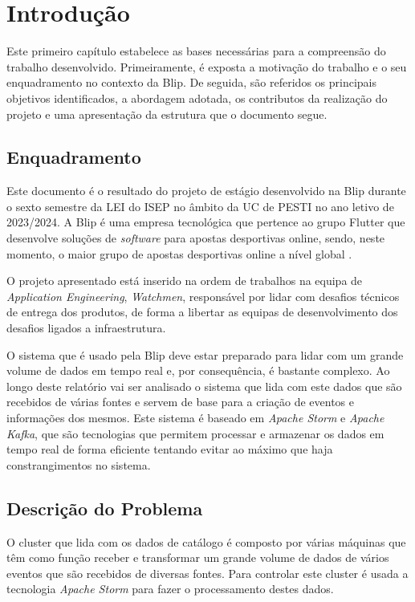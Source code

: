 \chapter{Introdução} 	
\label{sec:1-Introducao}

Este primeiro capítulo estabelece as bases necessárias para a compreensão do trabalho desenvolvido. 
Primeiramente, é exposta a motivação do trabalho e o seu enquadramento no contexto da Blip. 
De seguida, são referidos os principais objetivos identificados, a abordagem adotada, os contributos 
da realização do projeto e uma apresentação da estrutura que o documento segue.

\section{Enquadramento}

Este documento é o resultado do projeto de estágio desenvolvido na Blip durante o sexto semestre 
da \ac{LEI} do \ac{ISEP} no âmbito da \ac{UC} de \ac{PESTI} no ano letivo de 2023/2024. A Blip é 
uma empresa tecnológica que pertence ao grupo Flutter que desenvolve soluções de \textit{software} 
para apostas desportivas online, sendo, neste momento, o maior grupo de apostas desportivas online 
a nível global \cite{blip}.

O projeto apresentado está inserido na ordem de trabalhos na equipa de \textit{Application Engineering},
\textit{Watchmen}, responsável por lidar com desafios técnicos de entrega dos produtos, de forma
a libertar as equipas de desenvolvimento dos desafios ligados a infraestrutura.

O sistema que é usado pela Blip deve estar preparado para lidar com um grande volume de dados em 
tempo real e, por consequência, é bastante complexo. Ao longo deste relatório vai ser analisado 
o sistema que lida com este dados que são recebidos de várias fontes e servem de base para a criação 
de eventos e informações dos mesmos. Este sistema é baseado em \textit{Apache Storm} e 
\textit{Apache Kafka}, que são tecnologias que permitem processar e armazenar os dados em tempo 
real de forma eficiente tentando evitar ao máximo que haja constrangimentos no sistema.

\section{Descrição do Problema}

O \gls{cluster} que lida com os dados de catálogo é composto por várias máquinas que têm
como função receber e transformar um grande volume de dados de vários eventos que são recebidos de 
diversas fontes. Para controlar este \gls{cluster} é usada a tecnologia \textit{Apache Storm}
para fazer o processamento destes dados.

